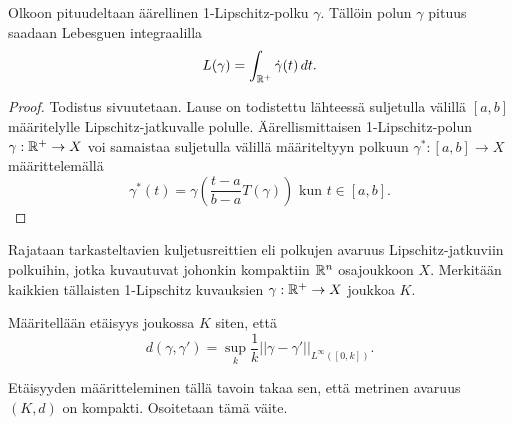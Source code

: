 \documentclass[12pt,oneside,a4paper]{amsbook} %
\begin{document}
\begin{theorem}
    Olkoon pituudeltaan äärellinen 1-Lipschitz-polku $\gamma$. Tällöin polun $\gamma$ pituus saadaan Lebesguen integraalilla
    \begin{equation*}
        L(\gamma) = \int_{\mathbb{R}^{+}} \dot \gamma(t) \, dt.
    \end{equation*}
\end{theorem}
\begin{proof}
    Todistus sivuutetaan. Lause on todistettu lähteessä \cite[s. 57] {burago} suljetulla välillä $[a, b]$ määritelylle Lipschitz-jatkuvalle polulle. Äärellismittaisen 1-Lipschitz-polun $\gamma:{\mathbb{R}^{+}} \to X$ voi samaistaa suljetulla välillä määriteltyyn polkuun $\gamma^*:[a,b] \to X$ määrittelemällä 
    \begin{equation*}
        \gamma^*(t) =  \gamma\left(\frac{t-a}{b-a}T(\gamma)\right) \text{ kun } t \in [a, b].
    \end{equation*}
\end{proof}


Rajataan tarkasteltavien kuljetusreittien eli polkujen avaruus
Lipschitz-jatkuviin polkuihin, jotka kuvautuvat johonkin kompaktiin $\mathbb{R}^n$ osajoukkoon $X$. Merkitään kaikkien tällaisten 1-Lipschitz kuvauksien $\gamma: {\mathbb{R}^{+}} \to X$  joukkoa $K$. 

\begin{definition}
    Määritellään etäisyys joukossa $K$ siten, että
    \[d(\gamma, \gamma') = \sup_k \frac{1}{k}||\gamma - \gamma'||_{L^\infty([0,k])}.\]
\end{definition}

Etäisyyden määritteleminen tällä tavoin takaa sen, että metrinen avaruus $(K, d)$ on kompakti. Osoitetaan tämä väite.
\end{document}
